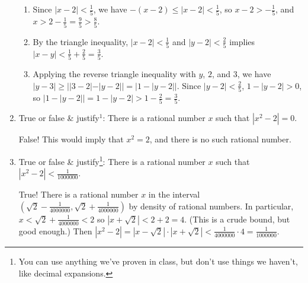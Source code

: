 \documentclass[12pt]{amsart}
\numberwithin{equation}{section}
\theoremstyle{plain} %
\theoremstyle{definition}
\theoremstyle{remark}
\begin{document}
\begin{enumerate}
\begin{framed}
\begin{enumerate}
\item Since $|x-2|<\frac{1}{5}$, we have $-(x-2) \leq |x-2|<\frac{1}{5}$, so $x-2 > -\frac{1}{5}$, and $x > 2-\frac{1}{5} = \frac{9}{5}> \frac{8}{5}$.
\item By the triangle inequality, $|x-2|<  \frac{1}{5}$ and $|y-2|<  \frac{2}{5}$ implies $|x-y| <  \frac{1}{5} + \frac{2}{5} = \frac{3}{5}$.
\item Applying the reverse triangle inequality with $y$, $2$, and $3$, we have $|y-3| \geq ||3-2| - |y-2|| = |1 - |y-2||$. Since $|y-2|<\frac{2}{5}$, $1-|y-2| > 0$, so $|1 - |y-2|| = 1- |y-2| > 1- \frac{2}{5} = \frac{3}{5}$.
\end{enumerate}

\end{framed}

\item True or false \& justify$^{\text{1}}$: There is a rational number $x$ such that $|x^2 - 2| = 0$.

\begin{framed}
False! This would imply that $x^2=2$, and there is no such rational number.
\end{framed}

\item True or false \& justify\footnote{You can use anything we've proven in class, but don't use things we haven't, like decimal expansions.}: There is a rational number $x$ such that $|x^2 - 2| < \frac{1}{1000000}$.

\begin{framed}
True! There is a rational number $x$ in the interval $(\sqrt{2} - \frac{1}{4000000}, \sqrt{2} + \frac{1}{4000000})$ by density of rational numbers. In particular, $x < \sqrt{2} +  \frac{1}{4000000} < 2$ so $|x+ \sqrt{2}| < 2 + 2 = 4$. (This is a crude bound, but good enough.)
Then $|x^2-2| = |x-\sqrt{2}| \cdot |x+\sqrt{2}| < \frac{1}{4000000} \cdot 4 = \frac{1}{1000000}$.
\end{framed}



\end{enumerate}
\end{document}

